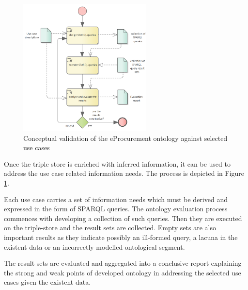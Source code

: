 	\begin{figure}[!ht]		
		\centering
		\includegraphics[width=0.6\textwidth]{../img/conceptualValidation.png}
		\caption{Conceptual validation of the eProcurement ontology against selected use cases}
		\label{fig:ontology-validation}
	\end{figure}
	
	Once the triple store is enriched with inferred information, it can be used to address the use case related information needs. The process is depicted in Figure \ref{fig:ontology-validation}. 
	
	Each use case carries a set of information needs which must be derived and expressed in the form of SPARQL queries. The ontology evaluation process commences with developing a collection of such queries. Then they are executed on the triple-store and the result sets are collected. Empty sets are also important results as they indicate possibly an ill-formed query, a lacuna in the existent data or an incorrectly modelled ontological segment.
	
	The result sets are evaluated and aggregated into a conclusive report explaining the strong and weak points of developed ontology in addressing the selected use cases given the existent data.  
	
	
	
	
	